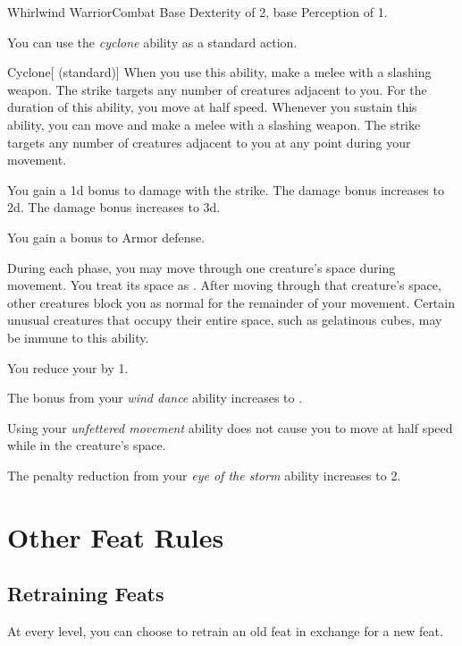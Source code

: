     \begin{feat}{Whirlwind Warrior}{Combat}
        \featpres Base Dexterity of 2, base Perception of 1.

         You can use the \textit{cyclone} ability as a standard action.
        \begin{freeability}{Cyclone}[ (standard)]
            When you use this ability, make a melee  with a slashing weapon.
            The strike targets any number of creatures adjacent to you.
            For the duration of this ability, you move at half speed.
            Whenever you sustain this ability, you can move and make a melee  with a slashing weapon.
            The strike targets any number of creatures adjacent to you at any point during your movement.

            \rankline
             You gain a \plus1d bonus to damage with the strike.
             The damage bonus increases to \plus2d.
             The damage bonus increases to \plus3d.
        \end{freeability}

         You gain a  bonus to Armor defense.

         During each phase, you may move through one creature's space during movement.
        You treat its space as .
        After moving through that creature's space, other creatures block you as normal for the remainder of your movement.
        Certain unusual creatures that occupy their entire space, such as gelatinous cubes, may be immune to this ability.

         You reduce your  by 1.

         The bonus from your \textit{wind dance} ability increases to .

         Using your \textit{unfettered movement} ability does not cause you to move at half speed while in the creature's space.

         The penalty reduction from your \textit{eye of the storm} ability increases to 2.
    \end{feat}

\section{Other Feat Rules}

    \subsection{Retraining Feats}
        At every level, you can choose to retrain an old feat in exchange for a new feat.
